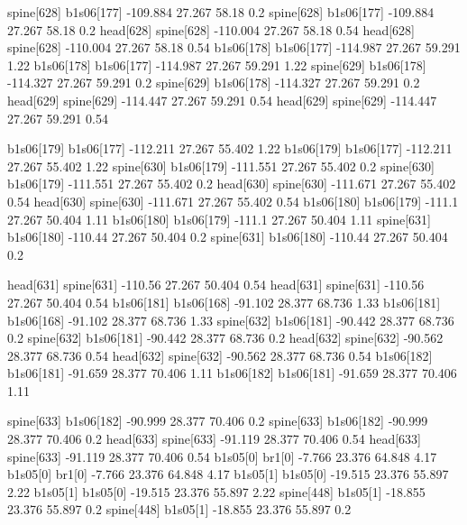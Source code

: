 spine[628]    b1s06[177]    -109.884    27.267    58.18    0.2
spine[628]    b1s06[177]    -109.884    27.267    58.18    0.2
head[628]    spine[628]    -110.004    27.267    58.18    0.54
head[628]    spine[628]    -110.004    27.267    58.18    0.54
b1s06[178]    b1s06[177]    -114.987    27.267    59.291    1.22
b1s06[178]    b1s06[177]    -114.987    27.267    59.291    1.22
spine[629]    b1s06[178]    -114.327    27.267    59.291    0.2
spine[629]    b1s06[178]    -114.327    27.267    59.291    0.2
head[629]    spine[629]    -114.447    27.267    59.291    0.54
head[629]    spine[629]    -114.447    27.267    59.291    0.54


b1s06[179]    b1s06[177]    -112.211    27.267    55.402    1.22
b1s06[179]    b1s06[177]    -112.211    27.267    55.402    1.22
spine[630]    b1s06[179]    -111.551    27.267    55.402    0.2
spine[630]    b1s06[179]    -111.551    27.267    55.402    0.2
head[630]    spine[630]    -111.671    27.267    55.402    0.54
head[630]    spine[630]    -111.671    27.267    55.402    0.54
b1s06[180]    b1s06[179]    -111.1    27.267    50.404    1.11
b1s06[180]    b1s06[179]    -111.1    27.267    50.404    1.11
spine[631]    b1s06[180]    -110.44    27.267    50.404    0.2
spine[631]    b1s06[180]    -110.44    27.267    50.404    0.2


head[631]    spine[631]    -110.56    27.267    50.404    0.54
head[631]    spine[631]    -110.56    27.267    50.404    0.54
b1s06[181]    b1s06[168]    -91.102    28.377    68.736    1.33
b1s06[181]    b1s06[168]    -91.102    28.377    68.736    1.33
spine[632]    b1s06[181]    -90.442    28.377    68.736    0.2
spine[632]    b1s06[181]    -90.442    28.377    68.736    0.2
head[632]    spine[632]    -90.562    28.377    68.736    0.54
head[632]    spine[632]    -90.562    28.377    68.736    0.54
b1s06[182]    b1s06[181]    -91.659    28.377    70.406    1.11
b1s06[182]    b1s06[181]    -91.659    28.377    70.406    1.11


spine[633]    b1s06[182]    -90.999    28.377    70.406    0.2
spine[633]    b1s06[182]    -90.999    28.377    70.406    0.2
head[633]    spine[633]    -91.119    28.377    70.406    0.54
head[633]    spine[633]    -91.119    28.377    70.406    0.54
b1s05[0]    br1[0]    -7.766    23.376    64.848    4.17
b1s05[0]    br1[0]    -7.766    23.376    64.848    4.17
b1s05[1]    b1s05[0]    -19.515    23.376    55.897    2.22
b1s05[1]    b1s05[0]    -19.515    23.376    55.897    2.22
spine[448]    b1s05[1]    -18.855    23.376    55.897    0.2
spine[448]    b1s05[1]    -18.855    23.376    55.897    0.2


